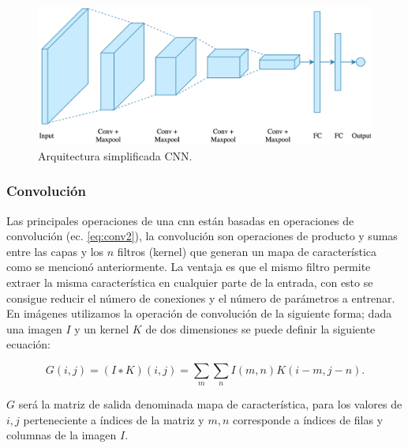 \begin{figure}[H]\centering
  \includegraphics[scale=0.2,keepaspectratio=true,clip=true]{imagenes/MarcoTeorico/cnn_intuition.png}
  \caption{Arquitectura simplificada CNN.}
  \label{Fig:cnn_network}
\end{figure}




\subsubsection{Convolución}\label{sub:convolucion}
Las principales operaciones de una \ac{cnn} están basadas en operaciones de convolución (ec. \eqref{eq:conv2}), la convolución son operaciones de producto y sumas entre las capas y los $n$ filtros (kernel) que generan  un mapa de característica como se mencionó anteriormente. La ventaja es que el mismo filtro permite extraer la misma característica en cualquier parte de la entrada, con esto se consigue reducir el número de conexiones y el número de parámetros a entrenar. En imágenes utilizamos la operación de convolución de la siguiente forma; dada una imagen $I$ y un kernel $K$ de dos dimensiones se puede definir la siguiente ecuación:

\begin{equation}\label{eq:conv2}
    G(i, j) = (I ∗ K)(i, j) = \sum_{m} \sum_{n} I(m, n) K(i - m, j - n).
\end{equation} 

$G$ será la matriz de salida denominada mapa de característica, para los valores de $i, j$ perteneciente a índices  de la matriz y $m, n$ corresponde a índices de filas y columnas de la imagen $I$.



